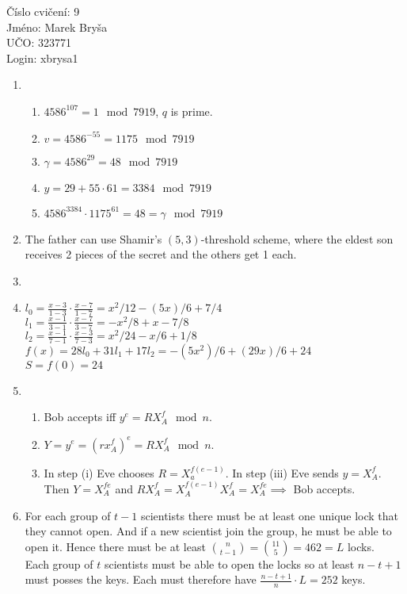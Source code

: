 \documentclass[a4paper,10pt]{extarticle}
\begin{document}
\begin{flushleft}
Číslo cvičení: 9 \\ 
Jméno: Marek Bryša \\
UČO: 323771\\
Login: xbrysa1\\
\end{flushleft}
\begin{enumerate}
  \item
    \begin{enumerate}
      \item
        $4586^{107}=1 \mod 7919$, $q$ is prime.
      \item
        $v=4586^{-55}=1175 \mod 7919$
      \item
        $\gamma=4586^{29}=48 \mod 7919$
      \item
        $y=29+55\cdot61=3384 \mod 7919$
      \item
        $4586^{3384}\cdot1175^{61}=48=\gamma \mod 7919$
    \end{enumerate}
  \item
    The father can use Shamir's $(5,3)$-threshold scheme, where the eldest son receives 2 pieces of the secret and the others get 1 each.
  \item
  \item
    $l_0=\frac{x-3}{1-3}\cdot\frac{x-7}{1-7}=x^2/12-(5 x)/6+7/4$\\
    $l_1=\frac{x-1}{3-1}\cdot\frac{x-7}{3-7}=-x^2/8+x-7/8$\\
    $l_2=\frac{x-1}{7-1}\cdot\frac{x-3}{7-3}=x^2/24-x/6+1/8$\\
    $f(x)=28l_0+31l_1+17l_2=-(5 x^2)/6+(29 x)/6+24$\\
    $S=f(0)=24$
  \item
    \begin{enumerate}
      \item
        Bob accepts iff $y^e=RX_A^f \mod n$.
      \item
        $Y=y^e=(rx_A^f)^e=RX_A^f \mod n$.
      \item
        In step (i) Eve chooses $R=X_a^{f(e-1)}$. In step (iii) Eve sends $y=X_A^f$. Then $Y=X_A^{fe}$ and $RX_A^f=X_A^{f(e-1)}X_A^f=X_A^{fe}\implies$ Bob accepts.
        
    \end{enumerate}
  \item
    For each group of $t-1$ scientists there must be at least one unique lock that they cannot open. And if a new scientist join the group, he must be able to open it. Hence there must be at least $\binom{n}{t-1}=\binom{11}{5}=462=L$ locks.\\
    Each group of $t$ scientists must be able to open the locks so at least $n-t+1$ must posses the keys. Each must therefore have $\frac{n-t+1}{n}\cdot L=252$ keys.
\end{enumerate}
\end{document}
